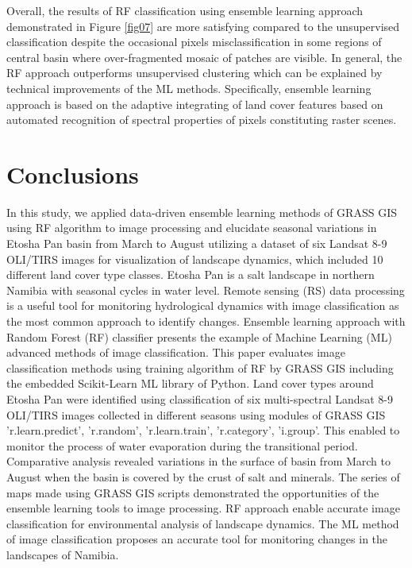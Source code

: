 \documentclass[climate,article,submit,pdftex,moreauthors]{Definitions/mdpi}
\begin{document}
Overall, the results of RF classification using ensemble learning approach demonstrated in Figure \ref{fig07} are more satisfying compared to the unsupervised classification despite the occasional pixels misclassification in some regions of central basin where over-fragmented mosaic of patches are visible. In general, the RF approach outperforms unsupervised clustering which can be explained by technical improvements of the ML methods. Specifically, ensemble learning approach is based on the adaptive integrating of land cover features based on automated recognition of spectral properties of pixels constituting raster scenes. 

\section{Conclusions}

In this study, we applied data-driven ensemble learning methods of GRASS GIS using RF algorithm to image processing and elucidate seasonal variations in Etosha Pan basin from March to August utilizing a dataset of six Landsat 8-9 OLI/TIRS images for visualization of landscape dynamics, which included 10 different land cover type classes. Etosha Pan is a salt landscape in northern Namibia with seasonal cycles in water level. Remote sensing (RS) data  processing is a useful tool for monitoring hydrological dynamics with image classification as the most common approach to identify changes. Ensemble learning approach with Random Forest (RF) classifier presents the example of Machine Learning (ML) advanced methods of image classification. This paper evaluates image classification methods using training algorithm of RF by GRASS GIS including the embedded Scikit-Learn ML library of Python. Land cover types around Etosha Pan were identified using classification of six multi-spectral Landsat 8-9 OLI/TIRS images collected in different seasons using modules of GRASS GIS 'r.learn.predict', 'r.random', 'r.learn.train', 'r.category', 'i.group'. This enabled to monitor the process of water evaporation during the transitional period. Comparative analysis revealed variations in the surface of basin from March to August when the basin is covered by the crust of salt and minerals. The series of maps made using GRASS GIS scripts demonstrated the opportunities of the ensemble learning tools to image processing. RF approach enable accurate image classification for environmental analysis of landscape dynamics. The ML method of image classification proposes an accurate tool for monitoring changes in the landscapes of Namibia.
\end{document}
